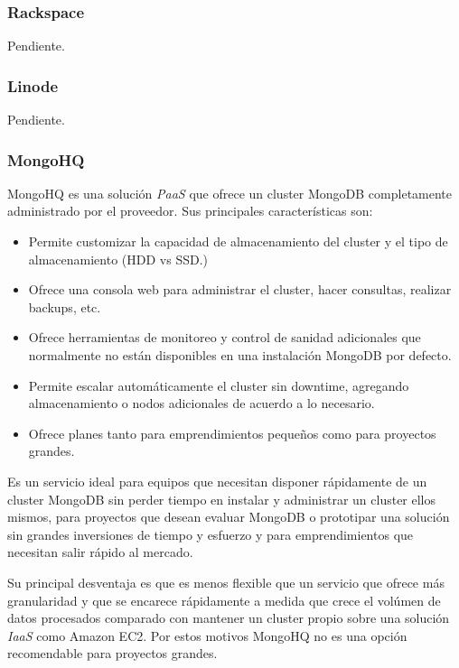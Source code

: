 \documentclass[a4paper,10pt,twoside]{article}
\begin{document}
\subsubsection{Rackspace}

Pendiente.


\subsubsection{Linode}

Pendiente.


\subsubsection{MongoHQ}

MongoHQ es una solución \emph{PaaS} que ofrece un cluster MongoDB completamente administrado por el proveedor. Sus principales características son:

\begin{itemize}
	\item Permite customizar la capacidad de almacenamiento del cluster y el tipo de almacenamiento (HDD vs SSD.)

	\item Ofrece una consola web para administrar el cluster, hacer consultas, realizar backups, etc.

	\item Ofrece herramientas de monitoreo y control de sanidad adicionales que normalmente no están disponibles en una instalación MongoDB por defecto.

	\item Permite escalar automáticamente el cluster sin downtime, agregando almacenamiento o nodos adicionales de acuerdo a lo necesario.

	\item Ofrece planes tanto para emprendimientos pequeños como para proyectos grandes.
\end{itemize}

Es un servicio ideal para equipos que necesitan disponer rápidamente de un cluster MongoDB sin perder tiempo en instalar y administrar un cluster ellos mismos, para proyectos que desean evaluar MongoDB o prototipar una solución sin grandes inversiones de tiempo y esfuerzo y para emprendimientos que necesitan salir rápido al mercado.

Su principal desventaja es que es menos flexible que un servicio que ofrece más granularidad y que se encarece rápidamente a medida que crece el volúmen de datos procesados comparado con mantener un cluster propio sobre una solución \emph{IaaS} como Amazon EC2. Por estos motivos MongoHQ no es una opción recomendable para proyectos grandes.
\end{document}
